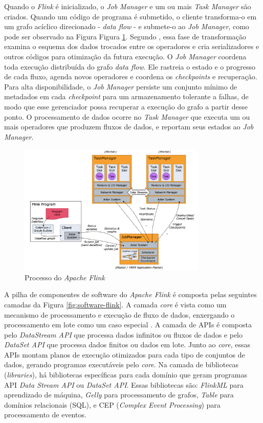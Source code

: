 Quando o \emph{Flink} é inicializado, o \emph{Job Manager} e um ou mais
\emph{Task Manager} são criados.
Quando um código de programa é submetido, o cliente transforma-o em um grafo
acíclico direcionado - \emph{data flow} - e submete-o ao \emph{Job Manager},
como pode ser observado na Figura Figura \ref{fig:processo-flink}.
Segundo , essa fase de transformação examina o esquema
dos dados trocados entre os operadores e cria serializadores e
outros códigos para otimização da futura execução.
O \emph{Job Manager} coordena toda execução distribuída do grafo \emph{data
flow}. Ele rastreia o estado e o progresso de cada fluxo, agenda novos
operadores e coordena os \emph{checkpoints} e recuperação.
Para alta disponibilidade, o \emph{Job Manager} persiste um conjunto mínimo de
metadados em cada \emph{checkpoint} para um armazenamento tolerante a falhas, de
modo que esse gerenciador possa recuperar a execução do grafo a partir desse
ponto.
O processamento de dados ocorre no \emph{Task Manager} que executa um ou mais
operadores que produzem fluxos de dados, e reportam seus estados ao \emph{Job
Manager}.

\begin{figure}[hbt]
\centering
\includegraphics[width=0.8\textwidth]{figuras/processo-flink.png}
\caption{Processo do \emph{Apache Flink} \cite{ApacheFlink2020}}
\label{fig:processo-flink}
\end{figure}

A pilha de componentes de software do \emph{Apache Flink} é composta pelas
seguintes camadas da Figura \ref{fig:software-flink}.
A camada \emph{core} é vista como um mecanismo de processamento e execução de
fluxo de dados, enxergando o processamento em lote como um caso especial
\cite{Lopez2018,Carbone2015}.
A camada de APIs é composta pelo \emph{DataStream API} que processa dados
infinitos ou fluxos de dados e pelo \emph{DataSet API} que processa dados
finitos ou dados em lote.
Junto ao \emph{core}, essas APIs montam planos de execução otimizados para cada
tipo de conjuntos de dados, gerando programas executáveis pelo \emph{core}.
Na camada de bibliotecas (\emph{libraries}), há bibliotecas específicas para
cada domínio que geram programas API \emph{Data Stream API} ou \emph{DataSet
API}.
Essas bibliotecas são: \emph{FlinkML} para aprendizado de máquina, \emph{Gelly}
para processamento de grafos, \emph{Table} para domínios relacionais (SQL), e
CEP (\emph{Complex Event Processing}) para processamento de eventos.

